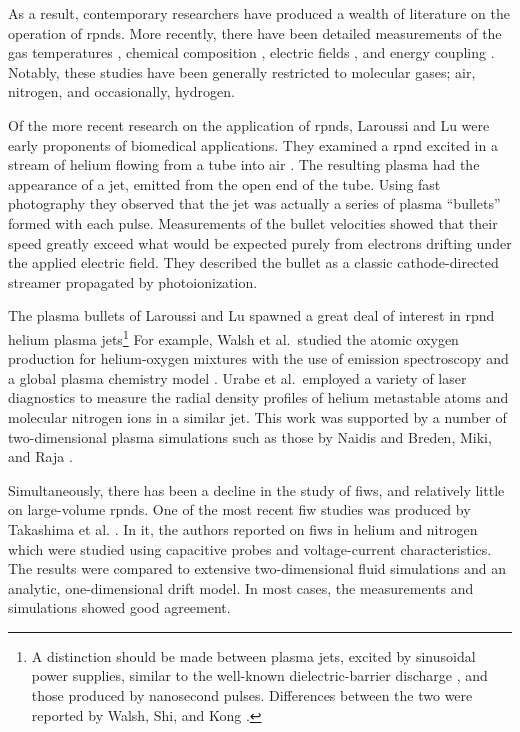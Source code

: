 As a result, contemporary researchers have produced a wealth of literature on
the operation of \acs{rpnd}s. More recently, there have been detailed
measurements of the gas temperatures \cite{Pilla2006, Pancheshnyi2006,
Nishihara2006, Bao2007, Lou2007, Pai2009, Zuzeek2010, Nishihara2011}, chemical
composition \cite{Bao2007, Lou2007, Pai2009}, electric fields \cite{Ito2009,
Ito2010, Muller2011a}, and energy coupling \cite{Macheret2006, Pancheshnyi2006}.
Notably, these studies have been generally restricted to molecular gases; air,
nitrogen, and occasionally, hydrogen.

Of the more recent research on the application of \acs{rpnd}s, Laroussi and Lu
were early proponents of biomedical applications. They examined a \acs{rpnd}
excited in a stream of helium flowing from a tube into air \cite{Laroussi2005,
Lu2006}. The resulting plasma had the appearance of a jet, emitted from the open
end of the tube. Using fast photography they observed that the jet was actually
a series of plasma ``bullets'' formed with each pulse. Measurements of the
bullet velocities showed that their speed greatly exceed what would be expected
purely from electrons drifting under the applied electric field. They described
the bullet as a classic cathode-directed streamer propagated by photoionization.

The plasma bullets of Laroussi and Lu spawned a great deal of interest in
\acs{rpnd} helium plasma jets\footnote{A distinction should be made between
plasma jets, excited by sinusoidal power supplies, similar to the well-known
dielectric-barrier discharge \cite{Kogelschatz2003}, and those produced by
nanosecond pulses. Differences between the two were reported by Walsh, Shi, and
Kong \cite{Walsh2006}.} For example, Walsh et al.\ studied the atomic oxygen
production for helium-oxygen mixtures with the use of emission spectroscopy and
a global plasma chemistry model \cite{Walsh2010}. Urabe et al.\ employed a
variety of laser diagnostics to measure the radial density profiles of helium
metastable atoms and molecular nitrogen ions in a similar jet. This work was
supported by a number of two-dimensional plasma simulations such as those by
Naidis \cite{Naidis2010} and Breden, Miki, and Raja \cite{Breden2011}.

Simultaneously, there has been a decline in the study of \acs{fiw}s, and
relatively little on large-volume \acs{rpnd}s. One of the most recent \acs{fiw}
studies was produced by Takashima et al. \cite{Takashima2011}. In it, the
authors reported on \acs{fiw}s in helium and nitrogen which were studied using
capacitive probes and voltage-current characteristics. The results were compared
to extensive two-dimensional fluid simulations and an analytic, one-dimensional
drift model. In most cases, the measurements and simulations showed good
agreement.

